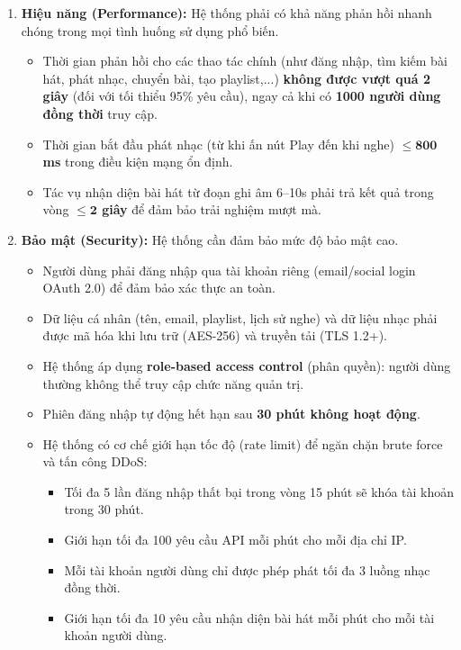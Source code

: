 \begin{enumerate}
    \item \textbf{Hiệu năng (Performance):} Hệ thống phải có khả năng phản hồi nhanh chóng trong mọi tình huống sử dụng phổ biến.
    \begin{itemize}
        \item Thời gian phản hồi cho các thao tác chính (như đăng nhập, tìm kiếm bài hát, phát nhạc, chuyển bài, tạo playlist,...) \textbf{không được vượt quá 2 giây} (đối với tối thiểu 95\% yêu cầu), ngay cả khi có \textbf{1000 người dùng đồng thời} truy cập.
        \item Thời gian bắt đầu phát nhạc (từ khi ấn nút Play đến khi nghe) \textbf{$\leq \mathbf{800}$ ms} trong điều kiện mạng ổn định.
        \item Tác vụ nhận diện bài hát từ đoạn ghi âm 6–10s phải trả kết quả trong vòng \textbf{$\leq \mathbf{2}$ giây} để đảm bảo trải nghiệm mượt mà.
    \end{itemize}

    \item \textbf{Bảo mật (Security):} Hệ thống cần đảm bảo mức độ bảo mật cao.
    \begin{itemize}
        \item Người dùng phải đăng nhập qua tài khoản riêng (email/social login OAuth 2.0) để đảm bảo xác thực an toàn.
        \item Dữ liệu cá nhân (tên, email, playlist, lịch sử nghe) và dữ liệu nhạc phải được mã hóa khi lưu trữ (AES-256) và truyền tải (TLS 1.2+).
        \item Hệ thống áp dụng \textbf{role-based access control} (phân quyền): người dùng thường không thể truy cập chức năng quản trị.
        \item Phiên đăng nhập tự động hết hạn sau \textbf{30 phút không hoạt động}.
        \item Hệ thống có cơ chế giới hạn tốc độ (rate limit) để ngăn chặn brute force và tấn công DDoS:
        \begin{itemize}
            \item Tối đa 5 lần đăng nhập thất bại trong vòng 15 phút sẽ khóa tài khoản trong 30 phút.
            \item Giới hạn tối đa 100 yêu cầu API mỗi phút cho mỗi địa chỉ IP.
            \item Mỗi tài khoản người dùng chỉ được phép phát tối đa 3 luồng nhạc đồng thời.
            \item Giới hạn tối đa 10 yêu cầu nhận diện bài hát mỗi phút cho mỗi tài khoản người dùng.
        \end{itemize}
    \end{itemize}


\end{enumerate}
